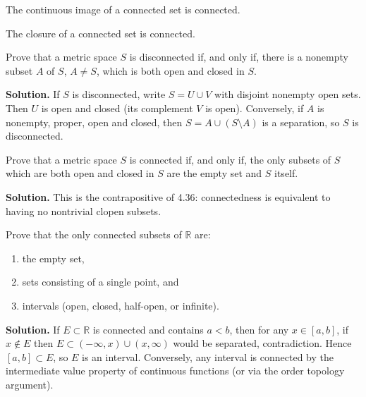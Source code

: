 \begin{theorem}
The continuous image of a connected set is connected.
\end{theorem}

\begin{theorem}
The closure of a connected set is connected.
\end{theorem}

\begin{problembox}
Prove that a metric space $S$ is disconnected if, and only if, there is a nonempty subset $A$ of $S$, $A \neq S$, which is both open and closed in $S$.
\end{problembox}

\noindent\textbf{Solution.}
If $S$ is disconnected, write $S=U\cup V$ with disjoint nonempty open sets. Then $U$ is open and closed (its complement $V$ is open). Conversely, if $A$ is nonempty, proper, open and closed, then $S=A\cup(S\setminus A)$ is a separation, so $S$ is disconnected.
\medskip

\begin{problembox}
Prove that a metric space $S$ is connected if, and only if, the only subsets of $S$ which are both open and closed in $S$ are the empty set and $S$ itself.
\end{problembox}

\noindent\textbf{Solution.}
This is the contrapositive of 4.36: connectedness is equivalent to having no nontrivial clopen subsets.
\medskip

\begin{problembox}
Prove that the only connected subsets of $\mathbb{R}$ are:
\begin{enumerate}[label=(\alph*)]
\item the empty set,
\item sets consisting of a single point, and
\item intervals (open, closed, half-open, or infinite).
\end{enumerate}
\end{problembox}

\noindent\textbf{Solution.}
If $E\subset\mathbb{R}$ is connected and contains $a<b$, then for any $x\in[a,b]$, if $x\notin E$ then $E\subset(-\infty,x)\cup(x,\infty)$ would be separated, contradiction. Hence $[a,b]\subset E$, so $E$ is an interval. Conversely, any interval is connected by the intermediate value property of continuous functions (or via the order topology argument).
\medskip

